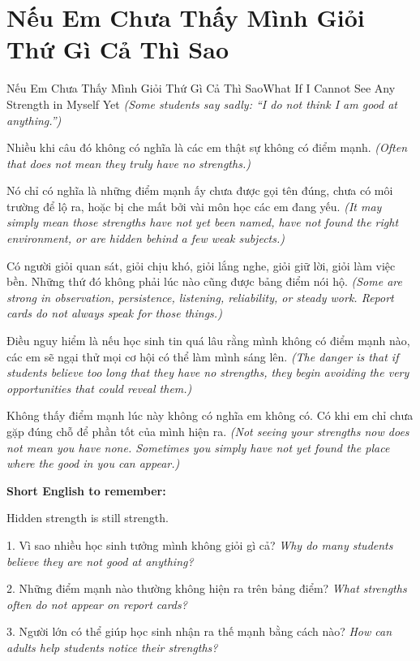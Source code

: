 \section{Nếu Em Chưa Thấy Mình Giỏi Thứ Gì Cả Thì Sao}
\begin{truyen}{Nếu Em Chưa Thấy Mình Giỏi Thứ Gì Cả Thì Sao}{What If I Cannot See Any Strength in Myself Yet}
\textit{(Some students say sadly: “I do not think I am good at anything.”)}

Nhiều khi câu đó không có nghĩa là các em thật sự không có điểm mạnh.
\textit{(Often that does not mean they truly have no strengths.)}

Nó chỉ có nghĩa là những điểm mạnh ấy chưa được gọi tên đúng, chưa có môi trường để lộ ra, hoặc bị che mất bởi vài môn học các em đang yếu.
\textit{(It may simply mean those strengths have not yet been named, have not found the right environment, or are hidden behind a few weak subjects.)}

Có người giỏi quan sát, giỏi chịu khó, giỏi lắng nghe, giỏi giữ lời, giỏi làm việc bền. Những thứ đó không phải lúc nào cũng được bảng điểm nói hộ.
\textit{(Some are strong in observation, persistence, listening, reliability, or steady work. Report cards do not always speak for those things.)}

Điều nguy hiểm là nếu học sinh tin quá lâu rằng mình không có điểm mạnh nào, các em sẽ ngại thử mọi cơ hội có thể làm mình sáng lên.
\textit{(The danger is that if students believe too long that they have no strengths, they begin avoiding the very opportunities that could reveal them.)}
\end{truyen}

\begin{baihoc}
Không thấy điểm mạnh lúc này không có nghĩa em không có. Có khi em chỉ chưa gặp đúng chỗ để phần tốt của mình hiện ra.
\textit{(Not seeing your strengths now does not mean you have none. Sometimes you simply have not yet found the place where the good in you can appear.)}
\end{baihoc}

\begin{ghinhoanh}
\textbf{Short English to remember:}

Hidden strength is still strength.

\end{ghinhoanh}

\begin{tuhocnhanh}
1. Vì sao nhiều học sinh tưởng mình không giỏi gì cả? \textit{Why do many students believe they are not good at anything?}

2. Những điểm mạnh nào thường không hiện ra trên bảng điểm? \textit{What strengths often do not appear on report cards?}

3. Người lớn có thể giúp học sinh nhận ra thế mạnh bằng cách nào? \textit{How can adults help students notice their strengths?}
\end{tuhocnhanh}
\ngancach
